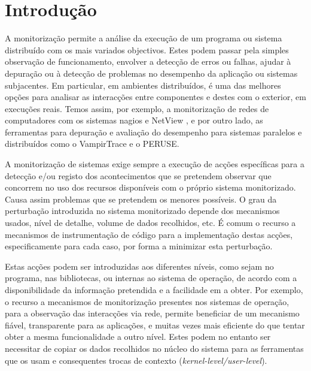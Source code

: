 \documentclass[a4paper]{llncs}
\begin{document}
\section{Introdução}
\label{sec:introduction}

A monitorização permite a análise da execução de um programa ou sistema distribuído com os mais variados objectivos.
 Estes podem passar pela simples observação de funcionamento, envolver a detecção de erros ou falhas, ajudar à depuração ou à detecção de problemas no desempenho da aplicação ou sistemas subjacentes.
 Em particular, em ambientes distribuídos, é uma das melhores opções para analisar as interacções entre componentes e destes com o exterior, em execuções reais. 
Temos assim, por exemplo, a monitorização de redes de computadores com os sistemas  nagios \cite{nagios} e NetView \cite{netview}, e por outro lado, as ferramentas para depuração e avaliação do desempenho para sistemas paralelos e distribuídos como o VampirTrace\cite{vampir:2008} e o PERUSE\cite{keller06}.




A monitorização de sistemas exige sempre a execução de acções específicas para a detecção e/ou registo dos acontecimentos que se pretendem observar que concorrem no uso dos recursos disponíveis com o próprio sistema monitorizado.
 Causa assim problemas que se pretendem os menores possíveis.
 O grau da perturbação introduzida no sistema monitorizado depende dos mecanismos usados, nível de detalhe, volume de dados recolhidos, etc.  
É comum o recurso a mecanismos de instrumentação de código para a implementação destas acções, especificamente para cada caso, por forma a minimizar esta perturbação.

Estas acções podem ser introduzidas aos diferentes níveis, como sejam no programa, nas bibliotecas, ou internas ao sistema de operação, de acordo com a disponibilidade da informação pretendida e a facilidade em a obter.
Por exemplo, o recurso a mecanismos de monitorização presentes nos sistemas de operação, para a observação das interacções via rede, permite beneficiar de um mecanismo fiável, transparente para as aplicações, e muitas vezes mais eficiente do que tentar obter a mesma funcionalidade a outro nível.
 Estes podem no entanto ser necessitar de copiar os dados recolhidos no núcleo do sistema para as ferramentas que os usam e consequentes trocas de contexto (\emph{kernel-level/user-level}).
\end{document}
